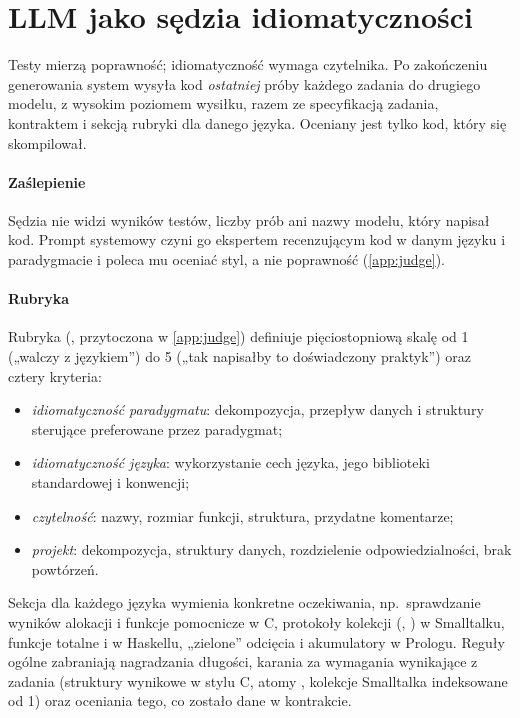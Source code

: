 \section{LLM jako sędzia idiomatyczności}
\label{sec:judge}

Testy mierzą poprawność; idiomatyczność wymaga czytelnika. Po zakończeniu generowania system wysyła
kod \emph{ostatniej} próby każdego zadania do drugiego modelu, \sonnet{} z wysokim poziomem
wysiłku, razem ze specyfikacją zadania, kontraktem i sekcją rubryki dla danego języka. Oceniany jest
tylko kod, który się skompilował.

\paragraph{Zaślepienie} Sędzia nie widzi wyników testów, liczby prób ani nazwy modelu, który napisał
kod. Prompt systemowy czyni go ekspertem recenzującym kod w danym języku i paradygmacie i poleca mu
oceniać styl, a nie poprawność (\cref{app:judge}).

\paragraph{Rubryka} Rubryka (, przytoczona w \cref{app:judge}) definiuje
pięciostopniową skalę od 1 („walczy z językiem”) do 5 („tak napisałby to doświadczony praktyk”)
oraz cztery kryteria:
\begin{itemize}
  \item \emph{idiomatyczność paradygmatu}: dekompozycja, przepływ danych i struktury sterujące
    preferowane przez paradygmat;
  \item \emph{idiomatyczność języka}: wykorzystanie cech języka, jego biblioteki standardowej
    i konwencji;
  \item \emph{czytelność}: nazwy, rozmiar funkcji, struktura, przydatne komentarze;
  \item \emph{projekt}: dekompozycja, struktury danych, rozdzielenie odpowiedzialności, brak
    powtórzeń.
\end{itemize}
Sekcja dla każdego języka wymienia konkretne oczekiwania, np.\ sprawdzanie wyników alokacji
i funkcje pomocnicze  w C, protokoły kolekcji (, )
w Smalltalku, funkcje totalne i  w Haskellu, „zielone” odcięcia i akumulatory
w Prologu. Reguły ogólne zabraniają nagradzania długości, karania za wymagania wynikające z zadania
(struktury wynikowe w stylu C, atomy , kolekcje Smalltalka indeksowane od 1) oraz
oceniania tego, co zostało dane w kontrakcie.

